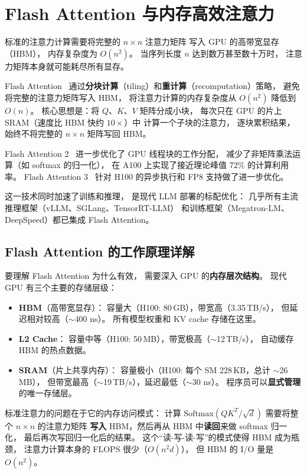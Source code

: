 \section{Flash Attention 与内存高效注意力}

标准的注意力计算需要将完整的 $n \times n$ 注意力矩阵
写入 GPU 的高带宽显存（HBM），
内存复杂度为 $O(n^2)$。
当序列长度 $n$ 达到数万甚至数十万时，
注意力矩阵本身就可能耗尽所有显存。

Flash Attention~\cite{dao2022flashattention}
通过\textbf{分块计算}（tiling）和\textbf{重计算}（recomputation）策略，
避免将完整的注意力矩阵写入 HBM，
将注意力计算的内存复杂度从 $O(n^2)$ 降低到 $O(n)$。
核心思想是：将 $Q$、$K$、$V$ 矩阵分成小块，
每次只在 GPU 的片上 SRAM（速度比 HBM 快约 $10\times$）中
计算一个子块的注意力，
逐块累积结果，始终不将完整的 $n \times n$ 矩阵写回 HBM。

Flash Attention 2~\cite{dao2023flashattention2}
进一步优化了 GPU 线程块的工作分配，
减少了非矩阵乘法运算（如 softmax 的归一化），
在 A100 上实现了接近理论峰值 72\% 的计算利用率。
Flash Attention 3~\cite{shah2024flashattention3}
针对 H100 的异步执行和 FP8 支持做了进一步优化。

这一技术同时加速了训练和推理，
是现代 LLM 部署的标配优化：
几乎所有主流推理框架（vLLM、SGLang、TensorRT-LLM）
和训练框架（Megatron-LM、DeepSpeed）都已集成 Flash Attention。

\subsection{Flash Attention 的工作原理详解}

要理解 Flash Attention 为什么有效，
需要深入 GPU 的\textbf{内存层次结构}。
现代 GPU 有三个主要的存储层级：
\begin{itemize}[noitemsep]
  \item \textbf{HBM}（高带宽显存）：
        容量大（H100: 80\,GB），带宽高（3.35\,TB/s），
        但延迟相对较高（$\sim$400 ns）。
        所有模型权重和 KV cache 存储在这里。
  \item \textbf{L2 Cache}：
        容量中等（H100: 50\,MB），带宽极高（$\sim$12\,TB/s），
        自动缓存 HBM 的热点数据。
  \item \textbf{SRAM}（片上共享内存）：
        容量极小（H100: 每个 SM 228\,KB，总计 $\sim$26\,MB），
        但带宽最高（$\sim$19\,TB/s），延迟最低（$\sim$30 ns）。
        程序员可以\textbf{显式管理}的唯一存储层。
\end{itemize}

标准注意力的问题在于它的内存访问模式：
计算 $\text{Softmax}(QK^T/\sqrt{d})$ 需要将整个 $n \times n$ 的注意力矩阵
\textbf{写入} HBM，然后再从 HBM 中\textbf{读回}来做 softmax 归一化，
最后再次写回归一化后的结果。
这个“读-写-读-写”的模式使得 HBM 成为瓶颈，
注意力计算本身的 FLOPS 很少（$O(n^2 d)$），
但 HBM 的 I/O 量是 $O(n^2)$。

